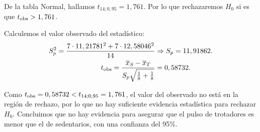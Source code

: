 \documentclass[11pt,spanish]{exam}
\begin{document}
\begin{questions}
\begin{parts}
\begin{solution}
De la tabla Normal, hallamos $t_{14;0,95} = 1,761$. Por lo que rechazaremos $H_0$ si es que $t_{\rm obs} > 1,761$.\hfill {}


Calculemos el valor observado del estadístico:
\begin{align*}
S_p^2 = \frac{7\cdot 11,21781^2 + 7\cdot 12,58046^2 }{14} &\Rightarrow S_p = 11,91862.\\
t_{\rm obs} =  \frac{\overline x_S - \overline x_T}{S_p \sqrt{\frac18 + \frac18} } &= 0,58732.
\end{align*}\hfill {}


Como $t_{\rm obs} = 0,58732 < t_{14;0,95} = 1,761$, el valor del observado no está en la región de rechazo, por lo que no hay suficiente evidencia estadística para rechazar $H_0$. Concluimos que no hay evidencia para asegurar que el pulso de trotadores es menor que el de sedentarios, con una confianza del 95\%.\hfill {}

\end{solution}


\end{parts}



\end{questions}
\end{document}

